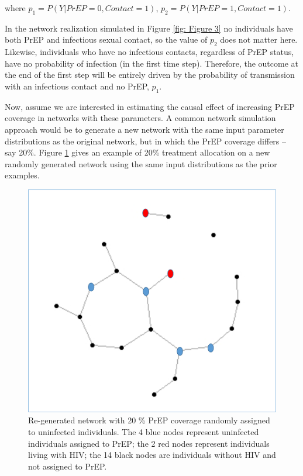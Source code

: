 \documentclass{article}
\theoremstyle{definition}
\begin{document}
where $p_1 = P(Y|PrEP=0,Contact=1)$, $p_2 = P(Y|PrEP=1,Contact=1)$.

In the network realization simulated in Figure \ref{fig: Figure 3} no individuals have both PrEP and infectious sexual contact, so the value of $p_2$ does not matter here. Likewise, individuals who have no infectious contacts, regardless of PrEP status, have no probability of infection (in the first time step). Therefore, the outcome at the end of the first step will be entirely driven by the probability of transmission with an infectious contact and no PrEP, $p_1$.

Now, assume we are interested in estimating the causal effect of increasing PrEP coverage in networks with these parameters. A common network simulation approach would be to generate a new network with the same input parameter distributions as the original network, but in which the PrEP coverage differs -- say 20\%. Figure \ref{fig: Figure 4} gives an example of 20\% treatment allocation on a new randomly generated network using the same input distributions as the prior examples.

\begin{figure}[H]
    \centering
    \includegraphics[scale=0.5]{Original Figures/Network Example 5.png}
    \caption{Re-generated network with 20 \% PrEP coverage randomly assigned to uninfected individuals. The 4 blue nodes represent uninfected individuals assigned to PrEP; the 2 red nodes represent individuals living with HIV; the 14 black nodes are individuals without HIV and not assigned to PrEP. }
    \label{fig: Figure 4}
\end{figure}
\end{document}
